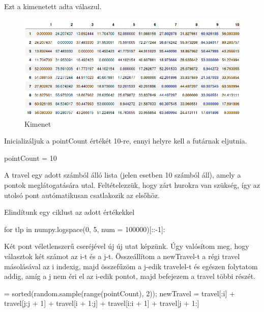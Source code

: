Ezt a kimenetett adta válaszul.

\begin{figure}[h!]
\centering
\includegraphics[width=\textwidth]{images/table.png}
\caption{Kimenet}
\label{fig:kimenet}
\end{figure}

Inicializáljuk a pointCount értékét 10-re, ennyi helyre kell a futárnak eljutnia.

\begin{python}
pointCount = 10
\end{python}

A travel egy adott számból álló lista (jelen esetben 10 számból áll), amely a pontok meglátogatására utal. Feltételezzük, hogy zárt hurokra van szükség, így az utolsó pont autómatikusan csatlakozik az elsőhöz.


\begin{python}
travel = random.sample(range(pointCount), pointCount);}
\end{python}

Elindítunk egy ciklust az adott értékekkel


\begin{python}
for tlp in numpy.logspace(0, 5, num = 100000)[::-1]:
\end{python}


Két pont véletlenszerű cseréjével új új utat képzünk. Úgy valósítom meg, hogy választok két számot az i-t és a j-t. Összeállítom a newTravel-t a régi travel másolásával az i indexig, majd összefűzöm a j-edik travelel-t és egészen folytatom addig, amíg a j nem éri el az i-edik pontot, majd befejezem a travel többi részét.


\begin{python}
[i, j] = sorted(random.sample(range(pointCount), 2));
newTravel = travel[:i] + 
			travel[j:j + 1] + 
			travel[i + 1:j] + 
			travel[i:i + 1] + 
			travel[j + 1:]
\end{python}



